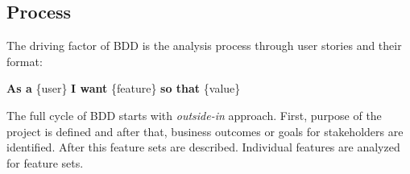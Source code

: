     \subsection{Process}
    The driving factor of BDD is the analysis process through user stories and their format:\newline\
    \begin{addmargin}[2em]{2em}
    \textbf{As a} \{user\}\newline
    \textbf{I want} \{feature\}\newline
    \textbf{so that} \{value\}\newline
    \end{addmargin}
    The full cycle of BDD starts with \textit{outside-in} approach. First, purpose of the project is defined and after that,
    business outcomes or goals for stakeholders are identified. After this feature sets are described.
    Individual features are analyzed for feature sets.~\cite{chelimsky2010rspec}


